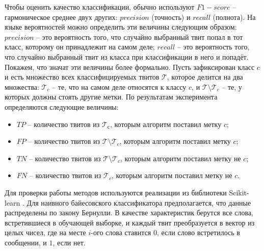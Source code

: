 Чтобы оценить качество классификации, обычно используют $F1-score$ -- гармоническое среднее двух
других: $precision$ (точность) и $recall$ (полнота). На языке вероятностей можно определить эти величины следующим образом: $precision$ -- это
вероятность того, что случайно выбранный твит попал в тот класс, которому он принадлежит
на самом деле; $recall$ -- это вероятность того, что случайно выбранный твит из класса
при классификации в него и попадёт. Покажем, что значат эти величины более формально.
Пусть зафиксирован класс $c$ и есть множество всех классифицируемых твитов $\mathcal{T}$,
которое делится на два множества: $\mathcal{T}_c$ -- те, что на самом деле относятся к классу $c$,
и $\mathcal{T}\setminus\mathcal{T}_c$ -- те, у которых должны стоять другие метки.
По результатам эксперимента определяются следующие величины:
  \begin{itemize}
    \setlength{\itemsep}{1pt}%
    \setlength{\parskip}{1pt}
  \item[ ] $TP$ -- количество твитов из $\mathcal{T}_с$, которым алгоритм поставил метку $c$; \nopagebreak
  \item[ ] $FP$ -- количество твитов из $\mathcal{T}\setminus\mathcal{T}_c$, которым алгоритм поставил метку $c$; \nopagebreak
  \item[ ] $TN$ -- количество твитов из $\mathcal{T}\setminus\mathcal{T}_c$, которым алгоритм поставил метку не $c$; \nopagebreak
  \item[ ] $FN$ -- количество твитов из $\mathcal{T}_c$, которым алгоритм поставил метку не $c$.
  \end{itemize}

Для проверки работы методов используются реализации из библиотеки
Scikit-learn \cite{scikit-learn}. Для наивного байесовского классификатора предполагается, что данные
распределены по закону Бернулли.
В качестве характеристик берутся все слова, встретившиеся в обучающей выборке,
и каждый твит преобразуется в вектор из целых чисел, где
на месте $i$-ого слова ставится $0$, если слово встретилось в сообщении, и $1$, если нет.

